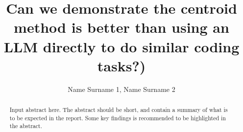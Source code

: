 \documentclass[a4paper]{article}
\begin{document}
\title{Can we demonstrate the centroid method is better than using an LLM directly to do similar coding tasks?)}
\author{Name Surname 1, Name Surname 2}
\maketitle

\begin{abstract}
    Input abstract here. The abstract should be short, and contain a summary of what is to be expected in the report. Some key findings is recommended to be highlighted in the abstract.
\end{abstract}







\end{document}
